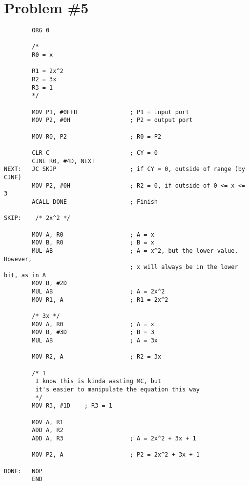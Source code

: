 \documentclass[12pt]{article}
\begin{document}
\section{Problem \#5}
\begin{verbatim}
        ORG 0

        /*
        R0 = x

        R1 = 2x^2
        R2 = 3x
        R3 = 1
        */

        MOV P1, #0FFH               ; P1 = input port
        MOV P2, #0H                 ; P2 = output port

        MOV R0, P2                  ; R0 = P2

        CLR C                       ; CY = 0
        CJNE R0, #4D, NEXT
NEXT:   JC SKIP                     ; if CY = 0, outside of range (by CJNE)
        MOV P2, #0H                 ; R2 = 0, if outside of 0 <= x <= 3
        ACALL DONE                  ; Finish

SKIP:    /* 2x^2 */

        MOV A, R0                   ; A = x
        MOV B, R0                   ; B = x
        MUL AB                      ; A = x^2, but the lower value. However,
                                    ; x will always be in the lower bit, as in A
        MOV B, #2D
        MUL AB                      ; A = 2x^2
        MOV R1, A                   ; R1 = 2x^2

        /* 3x */
        MOV A, R0                   ; A = x
        MOV B, #3D                  ; B = 3
        MUL AB                      ; A = 3x

        MOV R2, A                   ; R2 = 3x

        /* 1
         I know this is kinda wasting MC, but
         it's easier to manipulate the equation this way
         */
        MOV R3, #1D    ; R3 = 1

        MOV A, R1
        ADD A, R2
        ADD A, R3                   ; A = 2x^2 + 3x + 1

        MOV P2, A                   ; P2 = 2x^2 + 3x + 1

DONE:   NOP
        END
\end{verbatim}
\end{document}
